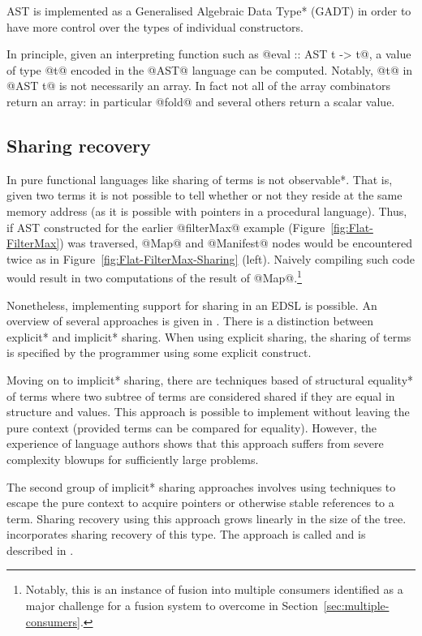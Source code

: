 \documentclass[preamble.tex]{subfiles}
\begin{document}
\LiveFusion AST is implemented as a \*Generalised Algebraic Data Type* (GADT) \cite{Jones:2006eh} in order to have more control over the types of individual constructors.

In principle, given an interpreting function such as @eval :: AST t -> t@, a value of type @t@ encoded in the @AST@ language can be computed. Notably, @t@ in @AST t@ is not necessarily an array. In fact not all of the array combinators return an array: in particular @fold@ and several others return a scalar value.


\subsection{Sharing recovery}
\label{sec:sharing-recovery}

In pure functional languages like \Haskell sharing of terms is \*not observable*. That is, given two terms it is not possible to tell whether or not they reside at the same memory address (as it is possible with pointers in a procedural language). Thus, if \LiveFusion AST constructed for the earlier @filterMax@ example (Figure~\ref{fig:Flat-FilterMax}) was traversed, @Map@ and @Manifest@ nodes would be encountered twice as in Figure~\ref{fig:Flat-FilterMax-Sharing} (left). Naively compiling such code would result in two computations of the result of @Map@.\footnote{Notably, this is an instance of fusion into multiple consumers identified as a major challenge for a fusion system to overcome in Section~\ref{sec:multiple-consumers}.}

Nonetheless, implementing support for sharing in an EDSL is possible. An overview of several approaches is given in \cite{ImplicitExplicitSharing}. There is a distinction between \*explicit* and \*implicit* sharing. When using explicit sharing, the sharing of terms is specified by the programmer using some explicit construct.

Moving on to \*implicit* sharing, there are techniques based of \*structural equality* of terms where two subtree of terms are considered shared if they are equal in structure and values. This approach is possible to implement without leaving the pure context (provided terms can be compared for equality). However, the experience of \Accelerate language authors \cite{CKL+11} shows that this approach suffers from severe complexity blowups for sufficiently large problems.

The second group of \*implicit* sharing approaches involves using techniques to escape the pure context to acquire pointers or otherwise stable references to a term. Sharing recovery using this approach grows linearly in the size of the tree. \LiveFusion incorporates sharing recovery of this type. The approach is called  and is described in \cite{ObservableSharing}.
\end{document}
